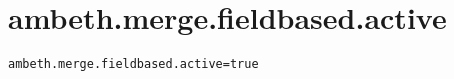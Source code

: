 \section{ambeth.merge.fieldbased.active}
\label{configuration:AmbethMergeFieldbasedActive}
\AvailableInJavaAndCsharp{\TODO}
\begin{lstlisting}[style=Props,caption={Usage example for \textit{ambeth.merge.fieldbased.active}}]
ambeth.merge.fieldbased.active=true
\end{lstlisting}